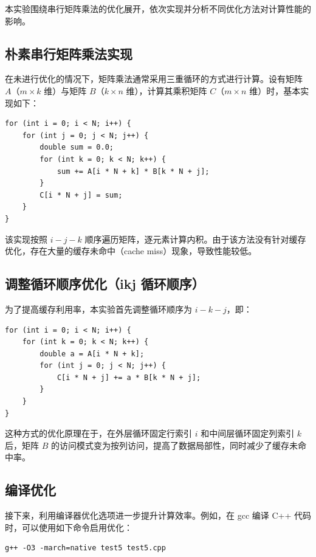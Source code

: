 \documentclass[a4paper, utf8]{ctexart}
\begin{document}
	本实验围绕串行矩阵乘法的优化展开，依次实现并分析不同优化方法对计算性能的影响。
	
	\subsection{朴素串行矩阵乘法实现}
	
	在未进行优化的情况下，矩阵乘法通常采用三重循环的方式进行计算。设有矩阵 $A$（$m \times k$ 维）与矩阵 $B$（$k \times n$ 维），计算其乘积矩阵 $C$（$m \times n$ 维）时，基本实现如下：
	
	\begin{verbatim}
for (int i = 0; i < N; i++) {
    for (int j = 0; j < N; j++) {
        double sum = 0.0;
        for (int k = 0; k < N; k++) {
            sum += A[i * N + k] * B[k * N + j];
        }
        C[i * N + j] = sum;
    }
}
	\end{verbatim}
	
	该实现按照 $i-j-k$ 顺序遍历矩阵，逐元素计算内积。由于该方法没有针对缓存优化，存在大量的缓存未命中（cache miss）现象，导致性能较低。
	
	\subsection{调整循环顺序优化（ikj 循环顺序）}
	
	为了提高缓存利用率，本实验首先调整循环顺序为 $i-k-j$，即：
	
	\begin{verbatim}
for (int i = 0; i < N; i++) {
    for (int k = 0; k < N; k++) {
        double a = A[i * N + k];
        for (int j = 0; j < N; j++) {
            C[i * N + j] += a * B[k * N + j];
        }
    }
}
	\end{verbatim}
	
	这种方式的优化原理在于，在外层循环固定行索引 $i$ 和中间层循环固定列索引 $k$ 后，矩阵 $B$ 的访问模式变为按列访问，提高了数据局部性，同时减少了缓存未命中率。
	
	\subsection{编译优化}
	
	接下来，利用编译器优化选项进一步提升计算效率。例如，在 gcc 编译 C++ 代码时，可以使用如下命令启用优化：
	
	\begin{verbatim}
g++ -O3 -march=native test5 test5.cpp
	\end{verbatim}
	
\end{document}
